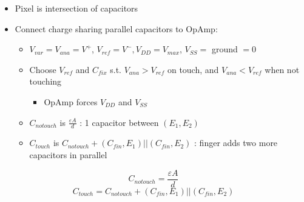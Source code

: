 \documentclass{article}\usepackage{amsmath,amssymb,amsthm,tikz,tkz-graph,color,chngpage,soul,hyperref,csquotes,graphicx,floatrow}\newcommand*{\QEDB}{\hfill\ensuremath{\square}}\newtheorem*{prop}{Proposition}\renewcommand{\theenumi}{\alph{enumi}}\usepackage[shortlabels]{enumitem}\usepackage[nobreak=true]{mdframed}\usetikzlibrary{matrix,calc}\MakeOuterQuote{"}\usepackage[margin=0.75in]{geometry} \newtheorem{theorem}{Theorem}
\begin{document}
\begin{itemize}
    \item Pixel is intersection of capacitors
    \item Connect charge sharing parallel capacitors to OpAmp:
    \begin{itemize}
        \item $V_{var} = V_{ana} = V^+$, $V_{ref} = V^-, V_{DD} = V_{max}$, $V_{SS} =$ ground $= 0$
        \item Choose $V_{ref}$ and $C_{fix}$ s.t. $V_{ana} > V_{ref}$ on touch, and $V_{ana} < V_{ref}$ when not touching
        \begin{itemize}
            \item OpAmp forces $V_{DD}$ and $V_{SS}$
        \end{itemize}
        \item $C_{notouch}$ is $\frac{\varepsilon A}{d}$ : 1 capacitor between $(E_1, E_2)$
        \item $C_{touch}$ is $C_{notouch} + (C_{fin}, E_1)||(C_{fin}, E_2)$ : finger adds two more capacitors in parallel
    \end{itemize}
\end{itemize}
\begin{mdframed}
\begin{equation}C_{notouch} = \frac{\varepsilon A}{d}\end{equation}
\begin{equation}C_{touch} = C_{notouch} + (C_{fin}, E_1)||(C_{fin}, E_2)\end{equation}
\end{mdframed}
\end{document}
